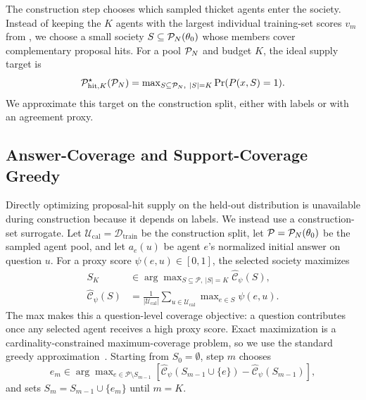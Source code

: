 The construction step chooses which sampled thicket agents enter the society.
Instead of keeping the $K$ agents with the largest individual training-set
scores $v_m$ from , we choose a small society
$S\subseteq{\mathcal{P}}_N(\theta_0)$ whose members cover complementary proposal hits.
For a pool \({\mathcal{P}}_N\) and budget $K$, the ideal supply target is
\begin{equation}
    \mathcal P_{\mathrm{hit},K}^\star({\mathcal{P}}_N)
    =
    \max\nolimits_{S\subseteq {\mathcal{P}}_N,\ |S|=K}\Pr(P(x,S)=1).
    \label{eq:proposal_hit_potential}
\end{equation}
We approximate this target on the construction split, either with labels or with
an agreement proxy.

\subsection{Answer-Coverage and Support-Coverage Greedy}
\label{subsec:proxy_greedy_covering}

Directly optimizing proposal-hit supply on the held-out distribution is
unavailable during construction because it depends on labels. We instead use a
construction-set surrogate. Let
$\mathcal U_{\mathrm{cal}}=\mathcal D_{\mathrm{train}}$ be the construction
split, let $\mathcal P={\mathcal{P}}_N(\theta_0)$ be the sampled agent pool, and let
$a_e(u)$ be agent $e$'s normalized initial answer on question $u$. For a proxy
score $\psi(e,u)\in[0,1]$, the selected society maximizes
\begin{equation}
\begin{aligned}
    S_K &\in \arg\max\nolimits_{S\subseteq\mathcal P,\ |S|=K}
    \widehat{\mathcal C}_\psi(S),\\
    \widehat{\mathcal C}_\psi(S)
    &=\frac{1}{|\mathcal U_{\mathrm{cal}}|}
    \sum\nolimits_{u\in\mathcal U_{\mathrm{cal}}}\max\nolimits_{e\in S}\psi(e,u).
    \label{eq:coverage_objective}
\end{aligned}
\end{equation}
The max makes this a question-level coverage objective: a question contributes
once any selected agent receives a high proxy score. Exact maximization is a
cardinality-constrained maximum-coverage problem, so we use the standard greedy
approximation~\citep{nemhauser1978analysis}. Starting from
$S_0=\emptyset$, step $m$ chooses
\begin{equation}
    e_m\in\arg\max\nolimits_{e\in\mathcal P\setminus S_{m-1}}
    \left[\widehat{\mathcal C}_\psi(S_{m-1}\cup\{e\})
    -\widehat{\mathcal C}_\psi(S_{m-1})\right],
    \label{eq:greedy_step}
\end{equation}
and sets $S_m=S_{m-1}\cup\{e_m\}$ until $m=K$.

